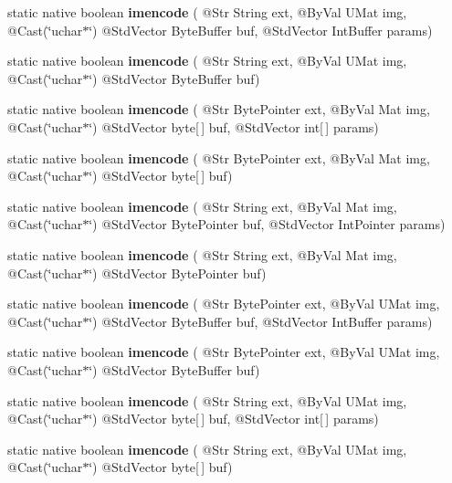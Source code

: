 \begin{DoxyCompactItemize}
\item 
static native boolean {\bfseries imencode} ( @Str String ext, @By\+Val U\+Mat img, @Cast(\char`\"{}uchar$\ast$\char`\"{}) @Std\+Vector Byte\+Buffer buf, @Std\+Vector Int\+Buffer params)
\item 
static native boolean {\bfseries imencode} ( @Str String ext, @By\+Val U\+Mat img, @Cast(\char`\"{}uchar$\ast$\char`\"{}) @Std\+Vector Byte\+Buffer buf)
\item 
static native boolean {\bfseries imencode} ( @Str Byte\+Pointer ext, @By\+Val Mat img, @Cast(\char`\"{}uchar$\ast$\char`\"{}) @Std\+Vector byte\mbox{[}$\,$\mbox{]} buf, @Std\+Vector int\mbox{[}$\,$\mbox{]} params)
\item 
static native boolean {\bfseries imencode} ( @Str Byte\+Pointer ext, @By\+Val Mat img, @Cast(\char`\"{}uchar$\ast$\char`\"{}) @Std\+Vector byte\mbox{[}$\,$\mbox{]} buf)
\item 
static native boolean {\bfseries imencode} ( @Str String ext, @By\+Val Mat img, @Cast(\char`\"{}uchar$\ast$\char`\"{}) @Std\+Vector Byte\+Pointer buf, @Std\+Vector Int\+Pointer params)
\item 
static native boolean {\bfseries imencode} ( @Str String ext, @By\+Val Mat img, @Cast(\char`\"{}uchar$\ast$\char`\"{}) @Std\+Vector Byte\+Pointer buf)
\item 
static native boolean {\bfseries imencode} ( @Str Byte\+Pointer ext, @By\+Val U\+Mat img, @Cast(\char`\"{}uchar$\ast$\char`\"{}) @Std\+Vector Byte\+Buffer buf, @Std\+Vector Int\+Buffer params)
\item 
static native boolean {\bfseries imencode} ( @Str Byte\+Pointer ext, @By\+Val U\+Mat img, @Cast(\char`\"{}uchar$\ast$\char`\"{}) @Std\+Vector Byte\+Buffer buf)
\item 
static native boolean {\bfseries imencode} ( @Str String ext, @By\+Val U\+Mat img, @Cast(\char`\"{}uchar$\ast$\char`\"{}) @Std\+Vector byte\mbox{[}$\,$\mbox{]} buf, @Std\+Vector int\mbox{[}$\,$\mbox{]} params)
\item 
static native boolean {\bfseries imencode} ( @Str String ext, @By\+Val U\+Mat img, @Cast(\char`\"{}uchar$\ast$\char`\"{}) @Std\+Vector byte\mbox{[}$\,$\mbox{]} buf)
\end{DoxyCompactItemize}
